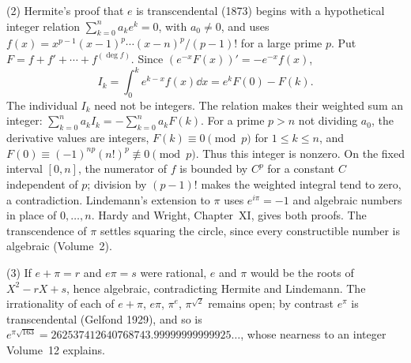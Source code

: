 (2) Hermite's proof that $e$ is transcendental (1873) begins with a hypothetical integer relation $\sum_{k=0}^n a_ke^k=0$, with $a_0\ne0$, and uses
$f(x)=x^{p-1}(x-1)^p\cdots(x-n)^p/(p-1)!$ for a large prime $p$.
Put $F=f+f'+\cdots+f^{(\deg f)}$. Since $(e^{-x}F(x))'=-e^{-x}f(x)$,
\[
I_k=\int_0^k e^{k-x}f(x)\dd x=e^kF(0)-F(k).
\]
The individual $I_k$ need not be integers. The relation makes their weighted sum an integer:
$\sum_{k=0}^n a_kI_k=-\sum_{k=0}^n a_kF(k)$.
For a prime $p>n$ not dividing $a_0$, the derivative values are integers, $F(k)\equiv0\pmod p$ for $1\le k\le n$, and
$F(0)\equiv(-1)^{np}(n!)^p\not\equiv0\pmod p$.
Thus this integer is nonzero. On the fixed interval $[0,n]$, the numerator of $f$ is bounded by $C^p$ for a constant $C$ independent of $p$; division by $(p-1)!$ makes the weighted integral tend to zero, a contradiction.
Lindemann's extension to $\pi$ uses $e^{i\pi}=-1$ and algebraic numbers in place of $0,\dots,n$. Hardy and Wright, Chapter~XI, gives both proofs. The transcendence of $\pi$ settles squaring the circle, since every constructible number is algebraic (Volume~2).

(3) If $e+\pi=r$ and $e\pi=s$ were rational, $e$ and $\pi$ would be the roots of $X^2-rX+s$, hence algebraic, contradicting Hermite and Lindemann. The irrationality of each of $e+\pi$, $e\pi$, $\pi^e$, $\pi^{\sqrt2}$ remains open; by contrast $e^\pi$ is transcendental (Gelfond 1929), and so is $e^{\pi\sqrt{163}}=262537412640768743.99999999999925\ldots$, whose nearness to an integer Volume~12 explains.

